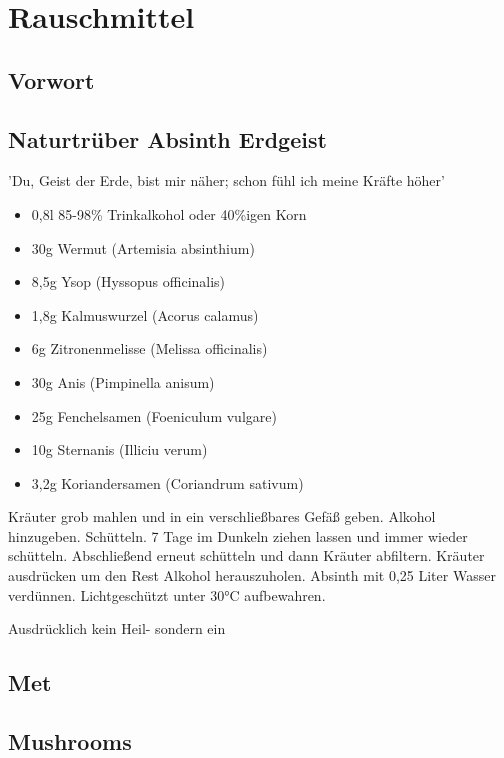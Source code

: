 \chapter{Rauschmittel}

\section{Vorwort}

\newpage


\section{Naturtrüber Absinth Erdgeist}

'Du, Geist der Erde, bist mir näher; schon fühl ich meine Kräfte höher'

\begin{itemize}
	\item 0,8l 85-98\% Trinkalkohol oder 40\%igen Korn
	\item 30g Wermut (Artemisia absinthium)
	\item 8,5g Ysop (Hyssopus officinalis)
	\item 1,8g Kalmuswurzel (Acorus calamus)
	\item 6g Zitronenmelisse (Melissa officinalis)
	\item 30g Anis (Pimpinella anisum)
	\item 25g Fenchelsamen (Foeniculum vulgare)
	\item 10g Sternanis (Illiciu verum)
	\item 3,2g Koriandersamen (Coriandrum sativum)
\end{itemize}

Kräuter grob mahlen und in ein verschließbares Gefäß geben.
Alkohol hinzugeben.
Schütteln.
7 Tage im Dunkeln ziehen lassen und immer wieder schütteln.
Abschließend erneut schütteln und dann Kräuter abfiltern.
Kräuter ausdrücken um den Rest Alkohol herauszuholen.
Absinth mit 0,25 Liter Wasser verdünnen.
Lichtgeschützt unter 30°C aufbewahren.


Ausdrücklich kein Heil- sondern ein 


\section{Met}


\section{Mushrooms}